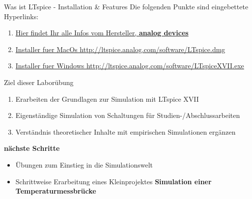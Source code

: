 \documentclass{beamer}
\begin{document}
\begin{frame}[fragile]{Was ist LTspice - Installation \& Features}
  Die folgenden Punkte sind eingebettete Hyperlinks:
  \begin{enumerate}
    \item \href{https://www.analog.com/en/design-center/design-tools-and-calculators/ltspice-simulator.html}{Hier findet Ihr alle Infos vom Hersteller, \textbf{analog devices}}
    \item \href{http://ltspice.analog.com/software/LTspice.dmg}{Installer fuer MacOs http://ltspice.analog.com/software/LTspice.dmg}
    \item \href{http://ltspice.analog.com/software/LTspiceXVII.exe}{Installer fuer Windows http://ltspice.analog.com/software/LTspiceXVII.exe}
  \end{enumerate}

  \begin{center}


  \end{center}
\end{frame}

\begin{frame}[fragile]{Ziel dieser Laborübung}

  \begin{enumerate}
    \item Erarbeiten der Grundlagen zur Simulation mit LTspice XVII
    \item Eigenständige Simulation von Schaltungen für Studien-/Abschlussarbeiten
    \item Verständnis theoretischer Inhalte mit empirischen Simulationen ergänzen
  \end{enumerate}

  \textbf{nächste Schritte}

  \begin{itemize}
    \item Übungen zum Einstieg in die Simulationswelt
    \item Schrittweise Erarbeitung eines Kleinprojektes \newline \textbf{Simulation einer Temperaturmessbrücke}
  \end{itemize}

\end{frame}
\end{document}
